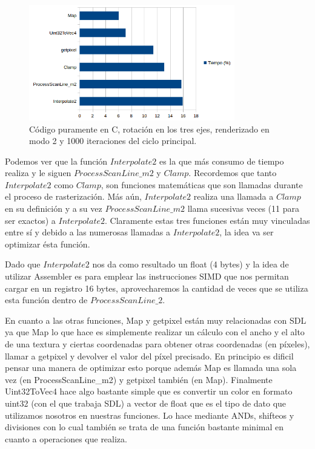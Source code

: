 \documentclass[a4paper]{article}
\newcounter{col}
\begin{document}
\begin{figure}[h]
    \centering
    \includegraphics[width=0.8\textwidth]{Imagenes/gprof1.png}
    \caption{Código puramente en C, rotación en los tres ejes, renderizado en modo 2 y 1000 iteraciones del ciclo principal.}
    \label{fig:mesh1}
\end{figure}


Podemos ver que la función $Interpolate2$ es la que más consumo de tiempo realiza y le siguen $ProcessScanLine\_m2$ y $Clamp$. Recordemos que tanto $Interpolate2$ como $Clamp$, son funciones matemáticas que son llamadas durante el proceso de rasterización. Más aún, $Interpolate2$ realiza una llamada a $Clamp$ en su definición y a su vez $ProcessScanLine\_m2$ llama sucesivas veces (11 para ser exactos) a $Interpolate2$. Claramente estas tres funciones están muy vinculadas entre sí y debido a las numerosas llamadas a $Interpolate2$, la idea va ser optimizar ésta función.
\par Dado que $Interpolate2$ nos da como resultado un float (4 bytes) y la idea de utilizar Assembler es para emplear las instrucciones SIMD que nos permitan cargar en un registro 16 bytes, aprovecharemos la cantidad de veces que se utiliza esta función dentro de $ProcessScanLine\_2$.

En cuanto a las otras funciones, Map y getpixel están muy relacionadas con SDL ya que Map lo que hace es simplemente realizar un cálculo con el ancho y el alto de una textura y ciertas coordenadas para obtener otras coordenadas (en píxeles), llamar a getpixel y devolver el valor del píxel precisado. En principio es dificil pensar una manera de optimizar esto porque además Map es llamada una sola vez (en ProcessScanLine_m2) y getpixel también (en Map). Finalmente Uint32ToVec4 hace algo bastante simple que es convertir un color en formato uint32 (con el que trabaja SDL) a vector de float que es el tipo de dato que utilizamos nosotros en nuestras funciones. Lo hace mediante ANDs, shifteos y divisiones con lo cual también se trata de una función bastante minimal en cuanto a operaciones que realiza.
\end{document}
